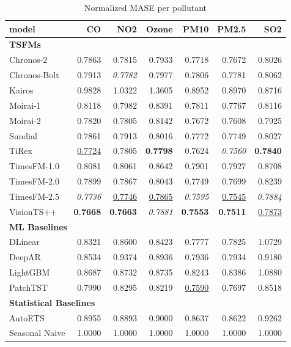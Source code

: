 \begin{table}[H]
\caption{Normalized MASE per pollutant}
\centering
\begin{small}
\begin{tabular}{lrrrrrr}
\toprule
model & CO & NO2 & Ozone & PM10 & PM2.5 & SO2 \\
\midrule
\multicolumn{7}{l}{\textbf{TSFMs}} \\
Chronos-2 & 0.7863 & 0.7815 & 0.7933 & 0.7718 & 0.7672 & 0.8026 \\
Chronos-Bolt & 0.7913 & \textit{0.7782} & 0.7977 & 0.7806 & 0.7781 & 0.8062 \\
Kairos & 0.9828 & 1.0322 & 1.3605 & 0.8952 & 0.8970 & 0.8716 \\
Moirai-1 & 0.8118 & 0.7982 & 0.8391 & 0.7811 & 0.7767 & 0.8116 \\
Moirai-2 & 0.7820 & 0.7805 & 0.8142 & 0.7672 & 0.7608 & 0.7925 \\
Sundial & 0.7861 & 0.7913 & 0.8016 & 0.7772 & 0.7749 & 0.8027 \\
TiRex & \underline{0.7724} & 0.7805 & \textbf{0.7798} & 0.7624 & \textit{0.7560} & \textbf{0.7840} \\
TimesFM-1.0 & 0.8081 & 0.8061 & 0.8642 & 0.7901 & 0.7927 & 0.8708 \\
TimesFM-2.0 & 0.7899 & 0.7867 & 0.8043 & 0.7749 & 0.7699 & 0.8239 \\
TimesFM-2.5 & \textit{0.7736} & \underline{0.7746} & \underline{0.7865} & \textit{0.7595} & \underline{0.7545} & \textit{0.7884} \\
VisionTS++ & \textbf{0.7668} & \textbf{0.7663} & \textit{0.7881} & \textbf{0.7553} & \textbf{0.7511} & \underline{0.7873} \\
\midrule
\multicolumn{7}{l}{\textbf{ML Baselines}} \\
DLinear & 0.8321 & 0.8600 & 0.8423 & 0.7777 & 0.7825 & 1.0729 \\
DeepAR & 0.8534 & 0.9374 & 0.8936 & 0.7936 & 0.7934 & 0.9180 \\
LightGBM & 0.8687 & 0.8732 & 0.8735 & 0.8243 & 0.8386 & 1.0880 \\
PatchTST & 0.7990 & 0.8295 & 0.8219 & \underline{0.7590} & 0.7697 & 0.8518 \\
\midrule
\multicolumn{7}{l}{\textbf{Statistical Baselines}} \\
AutoETS & 0.8955 & 0.8893 & 0.9000 & 0.8637 & 0.8622 & 0.9262 \\
Seasonal Naive & 1.0000 & 1.0000 & 1.0000 & 1.0000 & 1.0000 & 1.0000 \\
\bottomrule
\end{tabular}
\end{small}
\end{table}